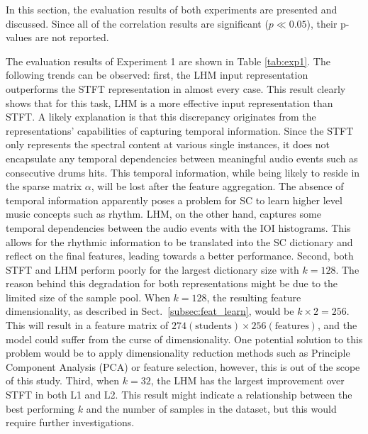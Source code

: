 \documentclass[conference]{IEEEtran}
\begin{document}
In this section, the evaluation results of both experiments are presented and discussed. Since all of the correlation results are significant ($p\ll 0.05$), their p-values are not reported.  

The evaluation results of Experiment 1 are shown in Table \ref{tab:exp1}. The following trends can be observed: first, the LHM input representation outperforms the STFT representation in almost every case. This result clearly shows that for this task, LHM is a more effective input representation than STFT. A likely explanation is that this discrepancy originates from the representations' capabilities of capturing temporal information. Since the STFT only represents the spectral content at various single instances, it does not encapsulate any temporal dependencies between meaningful audio events such as consecutive drums hits. This temporal information, while being likely to reside in the sparse matrix $\alpha$, will be lost after the feature aggregation. The absence of temporal information apparently poses a problem for SC to learn higher level music concepts such as rhythm. LHM, on the other hand, captures some temporal dependencies between the audio events with the IOI histograms. This allows for the rhythmic information to be translated into the SC dictionary and reflect on the final features, leading towards a better performance. 
Second, both STFT and LHM perform poorly for the largest dictionary size with $k = 128$. The reason behind this degradation for both representations might be due to the limited size of the sample pool. When $k = 128$, the resulting feature dimensionality, as described in Sect.~\ref{subsec:feat_learn}, would be $k \times 2 = 256$. This will result in a feature matrix of $274 (\text{students}) \times 256 (\text{features})$, and the model could suffer from the curse of dimensionality. One potential solution to this problem would be to apply dimensionality reduction methods such as Principle Component Analysis (PCA) or feature selection, however, this is out of the scope of this study. 
Third, when $k = 32$, the LHM has the largest improvement over STFT in both L1 and L2. This result might indicate a relationship between the best performing $k$ and the number of samples in the dataset, but this would require further investigations. 
\end{document}
